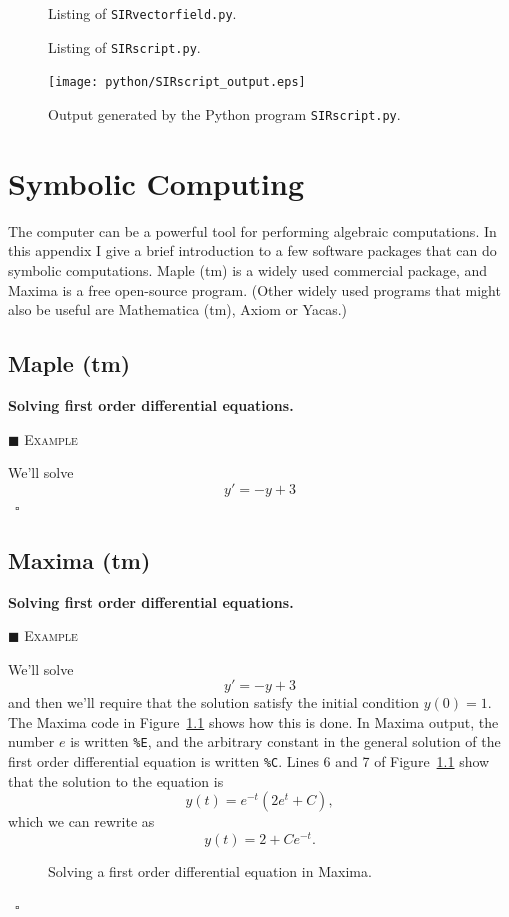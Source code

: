 \documentclass[reqno]{immbook}
\numberwithin{equation}{chapter}
\numberwithin{question}{section}
\numberwithin{theorem}{chapter}
\numberwithin{figure}{chapter}
\theoremstyle{definition}
\newenvironment{xexample}%
{%

\medskip\noindent\addtocounter{example}{1}$\blacksquare$ \textsc{Example \theexample}\hspace*{1em}%
}%
{%
~\hfill$\square$

\medskip
}
\begin{document}
%
%
\begin{figure}
\fbox{%

}
\caption{Listing of \texttt{SIRvectorfield.py}.}
\label{fig:pythonSIRvflisting}
\end{figure}

\begin{figure}
\fbox{%

}
\caption{Listing of \texttt{SIRscript.py}.}
\label{fig:pythonSIRscriptlisting}
\end{figure}

\begin{figure}
\centerline{\texttt{[image: python/SIRscript\_output.eps]}}
\caption{Output generated by the Python program
\texttt{SIRscript.py}.}
\label{fig:pythonSIRscriptoutput}
\end{figure}
%
%
\chapter{Symbolic Computing}
The computer can be a powerful tool for performing
algebraic computations.  In this appendix I give a brief introduction
to a few software packages that can do symbolic computations.
Maple (tm) is a widely used commercial
package, and Maxima is a free open-source
program.
(Other widely used programs that might also be useful
are Mathematica (tm), Axiom or Yacas.)
\section{Maple (tm)}
\textbf{Solving first order differential equations.}
\begin{xexample}
We'll solve
\[
   y' = -y + 3
\]
\end{xexample}
\section{Maxima (tm)}
\textbf{Solving first order differential equations.}
\begin{xexample}
We'll solve
\[
   y' = -y + 3
\]
and then we'll require that the solution satisfy the
initial condition $y(0)=1$.
The Maxima code in Figure~\ref{fig:maxima_example_firstorderde} shows how this is done.
In Maxima output, the number $e$ is written \texttt{\%E},
and the arbitrary constant in the general solution of
the first order differential equation is written \texttt{\%C}.
Lines 6 and 7 of Figure~\ref{fig:maxima_example_firstorderde} show that the
solution to the equation is
\[
    y(t) = e^{-t}\left(2 e^{t} + C\right),
\]
which we can rewrite as
\[
    y(t) = 2 + C e^{-t}.
\]
\begin{figure}[hbp]
\fbox{%

}
\caption{Solving a first order differential
equation in Maxima.}
\label{fig:maxima_example_firstorderde}
\end{figure}
\end{xexample}
%
\end{document}

